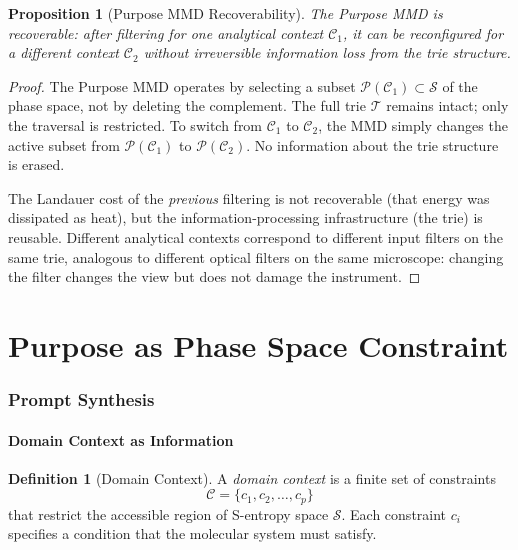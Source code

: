 \documentclass[11pt,twocolumn,a4paper]{article}
\newtheorem{proposition}[theorem]{Proposition}
\theoremstyle{definition}
\newtheorem{definition}[theorem]{Definition}
\theoremstyle{remark}
\newcommand{\Sspace}{\mathcal{S}}
\newcommand{\Trie}{\mathcal{T}}
\newcommand{\Purpose}{\mathcal{P}}
\newcommand{\Context}{\mathcal{C}}
\begin{document}
\begin{proposition}[Purpose MMD Recoverability]\label{prop:recoverability}
The Purpose MMD is recoverable: after filtering for one analytical context $\Context_1$, it can be reconfigured for a different context $\Context_2$ without irreversible information loss from the trie structure.
\end{proposition}

\begin{proof}
The Purpose MMD operates by selecting a subset $\Purpose(\Context_1) \subset \Sspace$ of the phase space, not by deleting the complement. The full trie $\Trie$ remains intact; only the traversal is restricted. To switch from $\Context_1$ to $\Context_2$, the MMD simply changes the active subset from $\Purpose(\Context_1)$ to $\Purpose(\Context_2)$. No information about the trie structure is erased.

The Landauer cost of the \emph{previous} filtering is not recoverable (that energy was dissipated as heat), but the information-processing infrastructure (the trie) is reusable. Different analytical contexts correspond to different input filters on the same trie, analogous to different optical filters on the same microscope: changing the filter changes the view but does not damage the instrument.
\end{proof}

\part{Purpose as Phase Space Constraint}\label{part:purpose}

\section{Prompt Synthesis}\label{sec:prompt-synthesis}

\subsection{Domain Context as Information}\label{sec:domain-context}

\begin{definition}[Domain Context]\label{def:domain-context}
A \emph{domain context} is a finite set of constraints
\begin{equation}\label{eq:domain-context}
  \Context = \{c_1, c_2, \ldots, c_p\}
\end{equation}
that restrict the accessible region of S-entropy space $\Sspace$. Each constraint $c_i$ specifies a condition that the molecular system must satisfy.
\end{definition}
\end{document}
